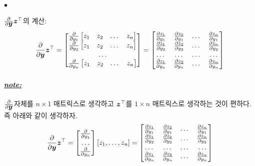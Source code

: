 \documentclass[12pt,oneside,english,a4paper]{article}
\def\ck{\paragraph{\Large$\bullet$}\Large}
\def\note{\paragraph{\Large\textit{\underline{note:}}}\Large}
\newcommand{\bsy}{\mbox{\boldmath $y$}}
\newcommand{\bsz}{\mbox{\boldmath $z$}}
\begin{document}
\ck $\frac{\partial }{\partial \bsy}\bsz^\top$의 계산: 
\[
\frac{\partial }{\partial \bsy}\bsz^\top=\begin{bmatrix} \frac{\partial}{\partial y_1}  \begin{bmatrix} z_1 & z_2 & \dots  & z_n \end{bmatrix} \\ \frac{\partial}{\partial y_{2}}  \begin{bmatrix} z_1 & z_2 & \dots  & z_n \end{bmatrix} \\ \dots  \\ \frac{\partial}{\partial y_n}  \begin{bmatrix} z_1 & z_2 & \dots  & z_n \end{bmatrix} \end{bmatrix}
=\begin{bmatrix} 
\frac{\partial z_1}{\partial y_1} & \frac{\partial z_2}{\partial y_1} & \dots  & \frac{\partial z_n}{\partial y_1} \\
\frac{\partial z_1}{\partial y_2} & \frac{\partial z_2}{\partial y_2} & \dots  & \frac{\partial z_n}{\partial y_2} \\
\dots & \dots & \dots  & \dots \\
\frac{\partial z_1}{\partial y_n} & \frac{\partial z_2}{\partial y_n} & \dots  & \frac{\partial z_n}{\partial y_n}
\end{bmatrix}
\]
\note $\frac{\partial}{\partial \bsy}$자체를 $n\times 1$ 매트릭스로 생각하고 $\bsz^\top$를 $1\times n$ 매트릭스로 생각하는 것이 편하다. 즉 아래와 같이 생각하자. 
\[
\frac{\partial }{\partial \bsy}\bsz^\top=
\begin{bmatrix}
\frac{\partial}{\partial y_1}\\
\dots\\
\frac{\partial}{\partial y_n}\\
\end{bmatrix}
[z_1,\dots,z_n]=\begin{bmatrix} 
\frac{\partial z_1}{\partial y_1} & \frac{\partial z_2}{\partial y_1} & \dots  & \frac{\partial z_n}{\partial y_1} \\
\frac{\partial z_1}{\partial y_2} & \frac{\partial z_2}{\partial y_2} & \dots  & \frac{\partial z_n}{\partial y_2} \\
\dots & \dots & \dots  & \dots \\
\frac{\partial z_1}{\partial y_n} & \frac{\partial z_2}{\partial y_n} & \dots  & \frac{\partial z_n}{\partial y_n}
\end{bmatrix}
\]
\end{document}

